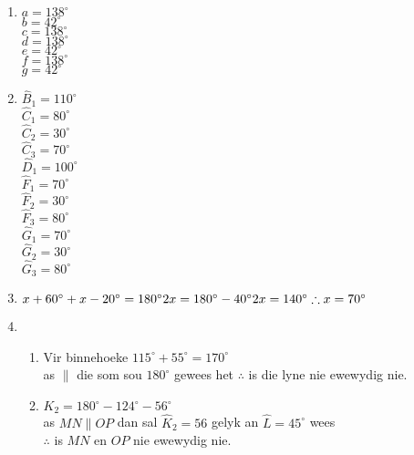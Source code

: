  \begin{solutions}{}{
\begin{enumerate}[itemsep=5pt, label=\textbf{\arabic*}. ] 


\item \begin{multicols}{2} %
    $a=138^{\circ}$\\ $b=42^{\circ}$\\ $c=138^{\circ}$\\ $d=138^{\circ}$\\ $e=42^{\circ}$\\ $f=138^{\circ}$\\ $g=42^{\circ}$
\end{multicols}
\item \begin{multicols}{2}%
 $\hat{B}_1=110^{\circ}$\\ $\hat{C}_1=80^{\circ}$\\ $\hat{C}_2=30^{\circ}$\\ $\hat{C}_3=70^{\circ}$\\ $\hat{D}_1=100^{\circ}$\\ $\hat{F}_1=70^{\circ}$\\ $\hat{F}_2=30^{\circ}$\\ $\hat{F}_3=80^{\circ}$\\ $\hat{G}_1=70^{\circ}$\\ $\hat{G}_2=30^{\circ}$\\ $\hat{G}_3=80^{\circ}$
\end{multicols}
\item %
$x + 60^\circ + x - 20^\circ = 180^\circ\\
2x = 180^\circ - 40^\circ\\
2x = 140^\circ\\
\therefore x = 70^\circ$

\item %
\begin{enumerate}[itemsep=3pt, label=\textbf{(\alph*)} ]
\item Vir binnehoeke $115^\circ + 55^\circ = 170^\circ$\\
as $\parallel$ die som sou $180^\circ$ gewees het $ \therefore$ is die lyne nie ewewydig nie.

\item $K_2 = 180^{\circ} - 124^\circ  - 56^\circ$\\
as $MN \parallel OP$ dan sal $\hat{K}_2 = 56$ gelyk an $\hat{L} = 45^\circ$ wees\\
$\therefore$ is $ MN$ en $OP$ nie ewewydig nie.


\end{enumerate}
\end{enumerate}}
\end{solutions}
